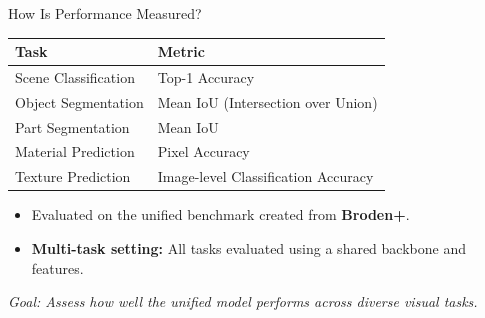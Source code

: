 \documentclass{beamer}
\begin{document}

\begin{frame}{How Is Performance Measured?}
  \vspace{0.4cm}
  \begin{tabular}{ll}
    \textbf{Task} & \textbf{Metric} \\
    \hline
    Scene Classification & Top-1 Accuracy \\
    Object Segmentation & Mean IoU (Intersection over Union) \\
    Part Segmentation & Mean IoU \\
    Material Prediction & Pixel Accuracy \\
    Texture Prediction & Image-level Classification Accuracy \\
  \end{tabular}
  \vspace{0.5cm}
  \begin{itemize}
    \item Evaluated on the unified benchmark created from \textbf{Broden+}.
    \item \textbf{Multi-task setting:} All tasks evaluated using a shared backbone and features.
  \end{itemize}
  \vfill
  \textit{Goal: Assess how well the unified model performs across diverse visual tasks.}
\end{frame}
\end{document}
